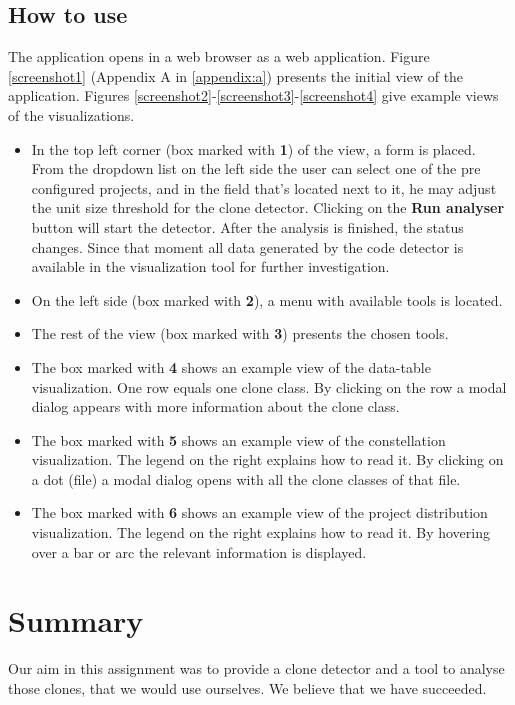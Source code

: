 \documentclass{uva-inf-article}
\begin{document}
\subsection{How to use}

The application opens in a web browser as a web application. Figure \ref{screenshot1} (Appendix A in \ref{appendix:a}) presents the initial view of the application. Figures \ref{screenshot2}-\ref{screenshot3}-\ref{screenshot4} give example views of the visualizations.

\begin{itemize}

\item{In the top left corner (box marked with \textbf{1}) of the view, a form is placed. From the dropdown list on the left side the user can select one of the pre configured projects, and in the field that's located next to it, he may adjust the unit size threshold for the clone detector. Clicking on the \textbf{Run analyser} button will start the detector. After the analysis is finished, the status changes. Since that moment all data generated by the code detector is available in the visualization tool for further investigation. }

\item{On the left side (box marked with \textbf{2}), a menu with available tools is located. }
\item{The rest of the view (box marked with \textbf{3}) presents the chosen tools. }
\item{The box marked with \textbf{4} shows an example view of the data-table visualization. One row equals one clone class. By clicking on the row a modal dialog appears with more information about the clone class.}
\item{The box marked with \textbf{5} shows an example view of the constellation visualization. The legend on the right explains how to read it. By clicking on a dot (file) a modal dialog opens with all the clone classes of that file. }
\item{The box marked with \textbf{6} shows an example view of the project distribution visualization. The legend on the right explains how to read it. By hovering over a bar or arc the relevant information is displayed.}
\end{itemize}

\section{Summary}
Our aim in this assignment was to provide a clone detector and a tool to analyse those clones, that we would use ourselves. We believe that we have succeeded. 
\end{document}
